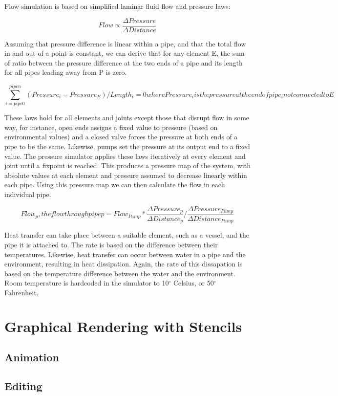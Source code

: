 \documentclass[11pt]{article}
\begin{document}
Flow simulation is based on simplified laminar fluid flow and pressure laws:

\[
Flow \propto \frac{\Delta Pressure}{\Delta Distance}
\]

Assuming that pressure difference is linear within a pipe, and that the total flow in and out of a point is constant, we can derive that for any element E, the sum of ratio between the pressure difference at the two ends of a pipe and its length for all pipes leading away from P is zero. 

\[
\sum_{i=pipe 0}^{pipe n}{ (Pressure_{i}-Pressure_{E}) / Length_{i} } = 0

where Pressure_{i} is the pressure at the end of pipe_{i} not connected to E
\]

These laws hold for all elements and joints except those that disrupt flow in some way, for instance, open ends assigns a fixed value to pressure (based on environmental values) and a closed valve forces the pressure at both ends of a pipe to be the same. Likewise, pumps set the pressure at its output end to a fixed value. The pressure simulator applies these laws iteratively at every element and joint until a fixpoint is reached. This produces a pressure map of the system, with absolute values at each element and pressure assumed to decrease linearly within each pipe. Using this pressure map we can then calculate the flow in each individual pipe.

\[
Flow_{p}, the flow through pipe p = Flow_{Pump} * \frac{\Delta Pressure_{p}}{\Delta Distance_{p}} / \frac{\Delta Pressure_{Pump}}{\Delta Distance_{Pump}}
\]

Heat transfer can take place between a suitable element, such as a vessel, and the pipe it is attached to. The rate is based on the difference between their temperatures. Likewise, heat transfer can occur between water in a pipe and the environment, resulting in heat dissipation. Again, the rate of this dissapation is based on the temperature difference between the water and the environment. Room temperature is hardcoded in the simulator to 10$^\circ$ Celsius, or 50$^\circ$ Fahrenheit.

\section{Graphical Rendering with Stencils}

\subsection{Animation}

\subsection{Editing}
\end{document}
